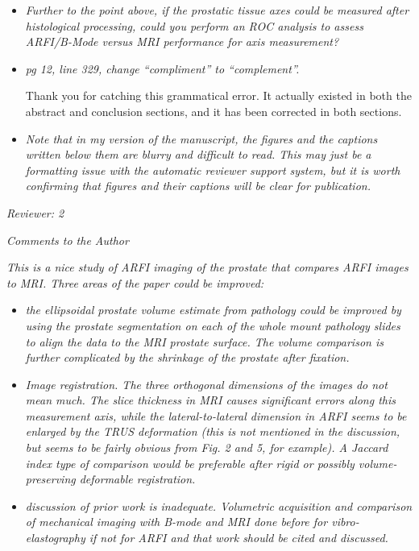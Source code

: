 \documentclass[10pt]{article}
\begin{document}
\begin{itemize}
    \item \textit{Further to the point above, if the prostatic tissue axes
            could be measured after histological processing, could you perform
            an ROC analysis to assess ARFI/B-Mode versus MRI performance for
            axis measurement?}

    \item \textit{pg 12, line 329, change ``compliment'' to ``complement''.}

    Thank you for catching this grammatical error.  It actually existed in both
    the abstract and conclusion sections, and it has been corrected in both
    sections.

    \item \textit{Note that in my version of the manuscript, the figures and
            the captions written below them are blurry and difficult to read.
            This may just be a formatting issue with the automatic reviewer
            support system, but it is worth confirming that figures and their
            captions will be clear for publication.}

\end{itemize}

\textit{Reviewer: 2}

\textit{Comments to the Author}

\textit{This is a nice study of ARFI imaging of the prostate that compares ARFI images
to MRI. Three areas of the paper could be improved:}

\begin{itemize}
    \item \textit{the ellipsoidal prostate volume estimate from pathology could be
        improved by using the prostate segmentation on each of the whole mount
        pathology slides to align the data to the MRI prostate surface. The
        volume comparison is further complicated by the shrinkage of the
        prostate after fixation.}

    \item \textit{Image registration. The three orthogonal dimensions of the
            images do not mean much. The slice thickness in MRI causes
            significant errors along this measurement axis, while the
            lateral-to-lateral dimension in ARFI seems to be enlarged by the
            TRUS deformation (this is not mentioned in the discussion, but
            seems to be fairly obvious from Fig. 2 and 5, for example). A
            Jaccard index type of comparison would be preferable after rigid or
            possibly volume-preserving deformable registration.}

    \item \textit{discussion of prior work is inadequate. Volumetric
            acquisition and comparison of mechanical imaging with B-mode and
            MRI done before for vibro-elastography if not for ARFI and that
            work should be cited and discussed.}
\end{itemize}
\end{document}
